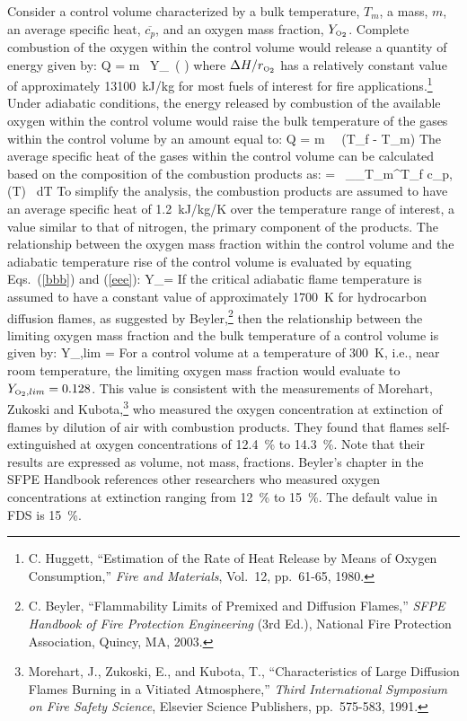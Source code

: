 Consider a control volume characterized
by a bulk temperature, $T_m$, a mass, $m$, an average specific heat, $\overline{c_p}$, and an oxygen mass
fraction, $Y_{\tiny \hbox{O}_2}$.  Complete combustion of the oxygen within the control volume would release a
quantity of energy given by:
\be
   Q = m \, Y_\OTWO \, \left(   \right)  \label{bbb}
\ee
where $\Delta H/r_{\tiny \hbox{O}_2}$ has a relatively constant value of
approximately 13100~kJ/kg for most fuels of interest for fire applications.\footnote{C. Huggett, ``Estimation of the Rate of Heat Release by Means of Oxygen
Consumption,'' {\em Fire and Materials}, Vol.~12, pp.~61-65, 1980.}
Under adiabatic conditions, the energy released by combustion of the available oxygen within
the control volume would raise the bulk temperature of the gases within the control volume by an
amount equal to:
\be
   Q = m \,  \, (T_f - T_m)  \label{eee}
\ee
The average specific heat of the gases within the control volume can be calculated based on the
composition of the combustion products as:
\be
    =  \, \sum_\alpha \int_{T_m}^{T_f} c_{p,\alpha} (T) \, dT
\ee
To simplify the analysis, the combustion products are assumed to have an average specific heat
of 1.2~kJ/kg/K over the temperature range of interest, a value similar to that of nitrogen, the primary
component of the products.
The relationship between the oxygen mass fraction within the control volume and the adiabatic
temperature rise of the control volume is evaluated by equating Eqs.~(\ref{bbb}) and (\ref{eee}):
\be
   Y_\OTWO = 
\ee
If the critical adiabatic flame temperature is assumed to have a constant value of approximately
1700~K for hydrocarbon diffusion flames, as suggested by Beyler,\footnote{C. Beyler, ``Flammability Limits of Premixed and Diffusion Flames,''
{\em SFPE Handbook of Fire Protection Engineering} (3rd Ed.), National Fire
Protection Association, Quincy, MA, 2003.} then the relationship
between the limiting oxygen mass fraction and the bulk temperature of a control volume is given
by:
\be
   Y_{\OTWO,lim} =  \approx  {}  \label{extinction_model}
\ee
For a control volume at a temperature of 300~K, i.e., near room temperature, the limiting oxygen
mass fraction would evaluate to $Y_{{\tiny \hbox{O}_2},lim}=0.128$.  This value is consistent with the measurements
of Morehart, Zukoski and Kubota,\footnote{Morehart, J., Zukoski, E., and Kubota, T., ``Characteristics of Large Diffusion Flames
Burning in a Vitiated Atmosphere,'' {\em Third International Symposium on Fire Safety
Science}, Elsevier Science Publishers, pp.~575-583, 1991.} who measured the oxygen concentration at extinction of flames by dilution of air
with combustion products. They found that flames self-extinguished at oxygen concentrations of 12.4~\% to 14.3~\%. Note that their results
are expressed as volume, not mass, fractions. Beyler's chapter in the SFPE Handbook references other researchers who measured oxygen
concentrations at extinction ranging from 12~\% to 15~\%. The default value in FDS is 15~\%.



